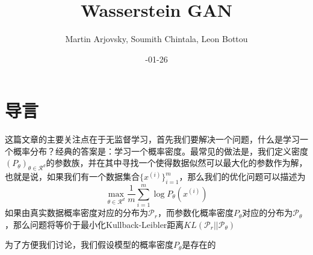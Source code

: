 \documentclass{ctexart}
\title{\li\xiaoyi Wasserstein GAN}
\author{\yahei Martin Arjovsky,  Soumith Chintala, Leon Bottou}
\date{\yahei 2017-01-26}
\begin{document}
\maketitle

\section{导言}
这篇文章的主要关注点在于无监督学习，首先我们要解决一个问题，什么是学习一个概率分布？经典的答案是：学习一个概率密度。最常见的做法是，我们定义密度$(P_\theta)_{\theta\in\mathcal{R}^d}$的参数族，并在其中寻找一个使得数据似然可以最大化的参数作为解，也就是说，如果我们有一个数据集合$\{x^{(i)}\}_{i=1}^m$，那么我们的优化问题可以描述为
\begin{equation}
\max\limits_{\theta\in\mathcal{R}^d}\frac{1}{m}\sum\limits_{i=1}^m\log P_\theta(x^{(i)})
\end{equation}
如果由真实数据概率密度对应的分布为$\mathcal{P}_r$，而参数化概率密度$P_\theta$对应的分布为$\mathcal{P}_\theta$，那么问题将等价于最小化Kullback-Leibler距离$KL(\mathcal{P}_r || \mathcal{P}_\theta)$

为了方便我们讨论，我们假设模型的概率密度$P_\theta$是存在的
\end{document}
